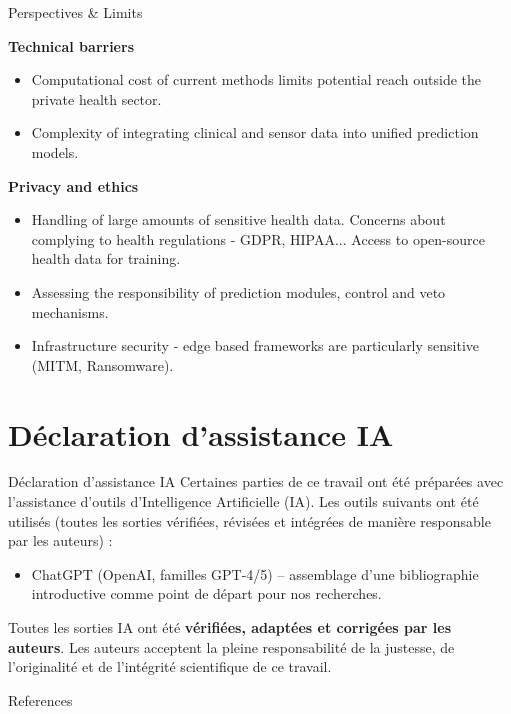 \documentclass{beamer}
\begin{document}
\begin{frame}{Perspectives \& Limits}
  
  \textbf{Technical barriers} 
  \begin{itemize}
    \item Computational cost of current methods limits potential reach outside the private health sector. 
    \item Complexity of integrating clinical and sensor data into unified prediction models.
  \end{itemize}
  \textbf{Privacy and ethics}
  \begin{itemize}
    \item Handling of large amounts of sensitive health data. Concerns about complying to health regulations - GDPR, HIPAA... Access to open-source health data for training.
    \item Assessing the responsibility of prediction modules, control and veto mechanisms.
    \item Infrastructure security - edge based frameworks are particularly sensitive (MITM, Ransomware).
  \end{itemize}
\end{frame}

\section*{Déclaration d'assistance IA}
\begin{frame}{Déclaration d'assistance IA}
  Certaines parties de ce travail ont été préparées avec l'assistance d'outils d'Intelligence Artificielle (IA). Les outils suivants ont été utilisés (toutes les sorties vérifiées, révisées et intégrées de manière responsable par les auteurs) :
  \begin{itemize}
    \item ChatGPT (OpenAI, familles GPT-4/5) – assemblage d'une bibliographie introductive comme point de départ pour nos recherches.
  \end{itemize}
  Toutes les sorties IA ont été \textbf{vérifiées, adaptées et corrigées par les auteurs}. Les auteurs acceptent la pleine responsabilité de la justesse, de l'originalité et de l'intégrité scientifique de ce travail.
\end{frame}

\begin{frame}[allowframebreaks]{References}
    \printbibliography
\end{frame}
\end{document}
